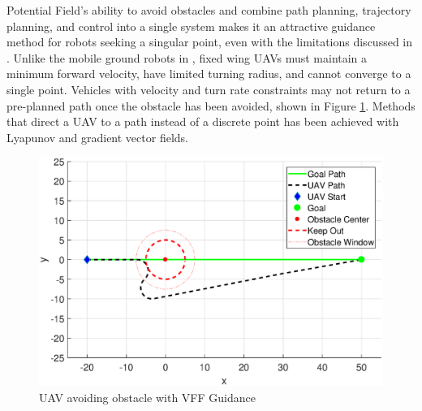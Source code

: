 \documentclass[numbered,pdftex]{ohio-etd}
\begin{document}
Potential Field's ability to avoid obstacles and combine path planning, trajectory planning, and control into a single system makes it an attractive guidance method for robots seeking a singular point, even with the limitations discussed in \cite{koren_potential_1991}. Unlike the mobile ground robots in \cite{borenstein_real-time_1990}, fixed wing UAVs must maintain a minimum forward velocity, have limited turning radius, and cannot converge to a single point. Vehicles with velocity and turn rate constraints may not return to a pre-planned path once the obstacle has been avoided, shown in Figure \ref{fig:vffSimulated}. Methods that direct a UAV to a path instead of a discrete point has been achieved with Lyapunov and gradient vector fields. 


\begin{figure}[H]
	\centering
	\includegraphics[width=15cm]{PaperFigures/Literature/vffSimulated}
	\caption{UAV avoiding obstacle with VFF Guidance}
	\label{fig:vffSimulated}
\end{figure}
\end{document}
